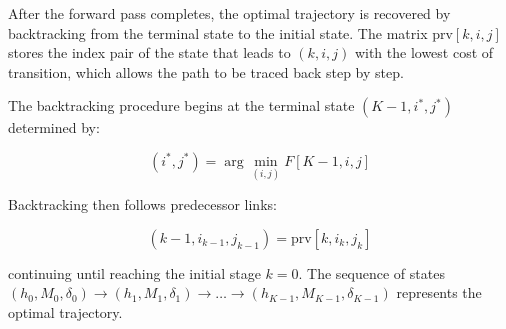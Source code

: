 After the forward pass completes, the optimal trajectory is recovered by backtracking from the terminal state to the initial state. The matrix \(\text{prv}[k,i,j]\) stores the index pair of the state that leads to \((k,i,j)\) with the lowest cost of transition,  which allows the path to be traced back step by step. 

The backtracking procedure begins at the terminal state $(K-1, i^*, j^*)$ determined by:

\begin{equation}
(i^*, j^*) = \arg\min_{(i,j)} F[K-1, i, j]
\end{equation}


Backtracking then follows predecessor links:

\begin{equation}
(k-1, i_{k-1}, j_{k-1}) = \text{prv}[k, i_k, j_k]
\end{equation}

continuing until reaching the initial stage $k = 0$. The sequence of states $(h_0, M_0, \delta_0) \to (h_1, M_1, \delta_1) \to \ldots \to (h_{K-1}, M_{K-1}, \delta_{K-1})$ represents the optimal trajectory.
